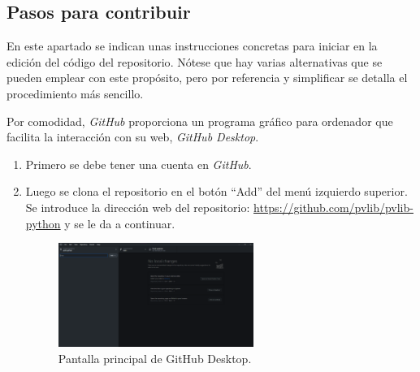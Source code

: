 \subsection{Pasos para contribuir}

En este apartado se indican unas instrucciones concretas para iniciar en la edición del código del \gls{repositorio}. Nótese que hay varias alternativas que se pueden emplear con este propósito, pero por referencia y simplificar se detalla el procedimiento más sencillo.

Por comodidad, \textit{GitHub} proporciona un programa gráfico para ordenador que facilita la interacción con su web, \textit{GitHub Desktop}.

\begin{enumerate}
    \item Primero se debe tener una cuenta en \textit{GitHub}.
    \item Luego se clona el \gls{repositorio} en el botón ``Add'' del menú izquierdo superior. Se introduce la dirección web del repositorio: \url{https://github.com/pvlib/pvlib-python} y se le da a continuar.

          \begin{figure}[H]
              \centering
              \includegraphics[width=0.6\textwidth]{images/SoA_foss/GH_DKT_0.png}
              \caption{Pantalla principal de GitHub Desktop.}
              \label{fig:GH_principal}
          \end{figure}


\end{enumerate}
